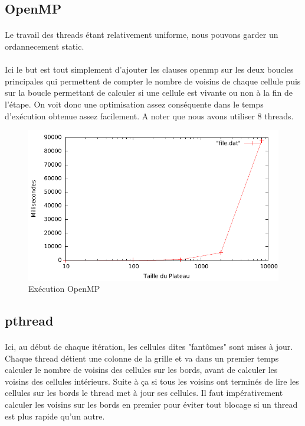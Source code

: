 \documentclass[12pt]{article}
\begin{document}
\subsection{OpenMP}
\paragraph{}Le travail des threads étant relativement uniforme, nous pouvons garder un ordannecement static.
\paragraph{}Ici le but est tout simplement d'ajouter les clauses openmp sur les deux boucles principales qui permettent de compter le nombre de voisins de chaque cellule puis sur la boucle permettant de calculer si une cellule est vivante ou non à la fin de l'étape. On voit donc une optimisation assez conséquente dans le temps d'exécution obtenue assez facilement. A noter que nous avons utiliser 8 threads.

\begin{figure}[!h]
	\begin{center}
		\includegraphics[scale=0.5]{omp.pdf}
	\end{center}
	\caption{Exécution OpenMP \label{fig:life_omp}}
\end{figure}
\subsection{pthread}
\paragraph{} Ici, au début de chaque itération, les cellules dites "fantômes" sont mises à jour. Chaque thread détient une colonne de la grille et va dans un premier temps calculer le nombre de voisins des cellules sur les bords, avant de calculer les voisins des cellules intérieurs. Suite à ça si tous les voisins ont terminés de lire les cellules sur les bords le thread met à jour ses cellules. Il faut impérativement calculer les voisins sur les bords en premier pour éviter tout blocage si un thread est plus rapide qu'un autre.
\end{document}
